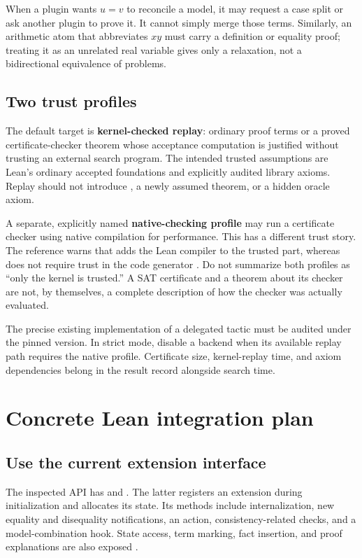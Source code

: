 When a plugin wants $u=v$ to reconcile a model, it may request a case split or
ask another plugin to prove it. It cannot simply merge those terms. Similarly,
an arithmetic atom that abbreviates $xy$ must carry a definition or equality
proof; treating it as an unrelated real variable gives only a relaxation, not
a bidirectional equivalence of problems.

\subsection{Two trust profiles}

The default target is \textbf{kernel-checked replay}: ordinary proof terms or a
proved certificate-checker theorem whose acceptance computation is justified
without trusting an external search program. The intended trusted assumptions
are Lean's ordinary accepted foundations and explicitly audited library
axioms. Replay should not introduce , a newly assumed theorem,
or a hidden oracle axiom.

A separate, explicitly named \textbf{native-checking profile} may run a
certificate checker using native compilation for performance. This has a
different trust story. The reference warns that  adds the
Lean compiler to the trusted part, whereas  does not require
trust in the code generator \cite{lean-tactics}. Do not summarize both profiles
as ``only the kernel is trusted.'' A SAT certificate and a theorem about its
checker are not, by themselves, a complete description of how the checker was
actually evaluated.

The precise existing implementation of a delegated tactic must be audited
under the pinned version. In strict mode, disable a backend when its available
replay path requires the native profile. Certificate size, kernel-replay time,
and axiom dependencies belong in the result record alongside search time.

\section{Concrete Lean integration plan}

\subsection{Use the current extension interface}

The inspected API has  and
. The latter registers an extension during
initialization and allocates its state. Its methods include internalization,
new equality and disequality notifications, an action, consistency-related
checks, and a model-combination hook. State access, term marking, fact insertion,
and proof explanations are also exposed \cite{grind-types}.

